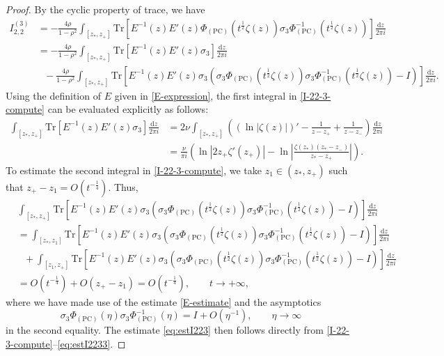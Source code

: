 \documentclass[11pt,a4paper]{article}
\numberwithin{equation}{section}
\begin{document}
\begin{proof}
By the cyclic property of trace, we have
\begin{align}\label{I-22-3-compute}
I^{(3)}_{2,2}&=-\frac{4\rho}{1-\rho^2}\int_{[z_*,z_+]}\mathrm{Tr}
\left[E^{-1}(z)E'(z)\Phi_{(\mathrm{PC})}(t^{\frac{1}{2}}\zeta(z))\sigma_3
\Phi_{(\mathrm{PC})}^{-1}(t^{\frac{1}{2}}\zeta(z))\right]\frac{\mathrm{d}z}{2\pi i}\nonumber\\
&=-\frac{4\rho}{1-\rho^2}\int_{[z_*,z_+]}\mathrm{Tr}
\left[E^{-1}(z)E'(z)\sigma_3\right]\frac{\mathrm{d}z}{2\pi i}\nonumber\\
&~~~-\frac{4\rho}{1-\rho^2}\int_{[z_*,z_+]}\mathrm{Tr}
\left[E^{-1}(z)E'(z)\sigma_3\left(\sigma_3\Phi_{(\mathrm{PC})}(t^{\frac{1}{2}}\zeta(z))
\sigma_3\Phi_{(\mathrm{PC})}^{-1}(t^{\frac{1}{2}}\zeta(z))-I\right)\right]
\frac{\mathrm{d}z}{2\pi i}.
\end{align}
Using the definition of $E$ given in \eqref{E-expression}, the first integral in \eqref{I-22-3-compute} can be evaluated explicitly as follows:
\begin{align}
\int_{[z_*,z_+]}\mathrm{Tr}
\left[E^{-1}(z)E'(z)\sigma_3\right]\frac{\mathrm{d}z}{2\pi i}
&=2\nu\int_{[z_*,z_+]}\left(\left(\ln|\zeta(z)|\right)'-\frac{1}{z-z_+}
+\frac{1}{z-z_-}\right)\frac{\mathrm{d}z}{2\pi i} \nonumber \\
&=\frac{\nu}{\pi i}\left(\ln\left|2z_+\zeta'(z_+)\right|
-\ln\left|\frac{\zeta(z_*)(z_*-z_-)}{z_*-z_+}\right|\right). \label{eq:estI2232}
\end{align}
To estimate the second integral in \eqref{I-22-3-compute}, we take $z_1\in(z_*,z_+)$ such that $z_+-z_1=O(t^{-\frac{1}{4}})$.
Thus,
\begin{align}
&\int_{[z_*,z_+]}\mathrm{Tr}
\left[E^{-1}(z)E'(z)\sigma_3\left(\sigma_3\Phi_{(\mathrm{PC})}(t^{\frac{1}{2}}\zeta(z))
\sigma_3\Phi_{(\mathrm{PC})}^{-1}(t^{\frac{1}{2}}\zeta(z))-I\right)\right]
\frac{\mathrm{d}z}{2\pi i}\nonumber \\
&=\int_{[z_*,z_1]}\mathrm{Tr}
\left[E^{-1}(z)E'(z)\sigma_3\left(\sigma_3\Phi_{(\mathrm{PC})}(t^{\frac{1}{2}}\zeta(z))
\sigma_3\Phi_{(\mathrm{PC})}^{-1}(t^{\frac{1}{2}}\zeta(z))-I\right)\right]
\frac{\mathrm{d}z}{2\pi i}\nonumber \\
&~~~+\int_{[z_1,z_+]}\mathrm{Tr}
\left[E^{-1}(z)E'(z)\sigma_3\left(\sigma_3\Phi_{(\mathrm{PC})}(t^{\frac{1}{2}}\zeta(z))
\sigma_3\Phi_{(\mathrm{PC})}^{-1}(t^{\frac{1}{2}}\zeta(z))-I\right)\right]
\frac{\mathrm{d}z}{2\pi i}\nonumber \\
&=O\left(t^{-\frac{1}{4}}\right)+O(z_+-z_1)=O\left(t^{-\frac{1}{4}}\right),
\qquad t\to+\infty, \label{eq:estI2233}
\end{align}
where we have made use of the estimate \eqref{E-estimate} and the asymptotics $$\sigma_3\Phi_{(\mathrm{PC})}(\eta)\sigma_3\Phi_{(\mathrm{PC})}^{-1}(\eta)
=I+O\left(\eta^{-1}\right),\qquad \eta\to\infty$$ in the second equality. The estimate \eqref{eq:estI223} then follows directly from \eqref{I-22-3-compute}--\eqref{eq:estI2233}.
\end{proof}
\end{document}
